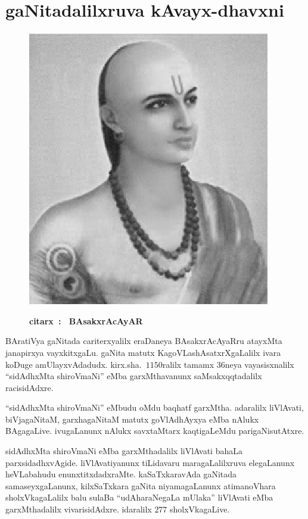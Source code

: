 \chapter{gaNitadalilxruva kAvayx-dhavxni}\label{chap13}

\begin{figure}
  \centering\includegraphics[scale=0.8]{src/figures/bhaskaracharya-II.eps}
  
  {\bf citarx~:~ BAsakxrAcAyAR}
    \end{figure}
    
BAratiVya gaNitada cariterxyalilx eraDaneya BAsakxrAcAyaRru atayxMta janapirxya vayxkitxgaLu. gaNita matutx KagoVLashAsatxrXgaLalilx ivara koDuge amUlayxvAdadudx. kirx.sha.\ $1150$ralilx tamamx $36$neya vayasisxnalilx ``sidAdhxMta shiroVmaNi'' eMba garxMthavanunx saMsakxqqtadalilx racisidAdxre.

``sidAdhxMta shiroVmaNi'' eMbudu oMdu baqhatf garxMtha. adaralilx liVlAvati, biVjagaNitaM, garxhagaNitaM matutx goVlAdhAyxya eMba nAlukx BAgagaLive. ivugaLanunx nAlukx savxtaMtarx kaqtigaLeMdu parigaNisutAtxre.

sidAdhxMta shiroVmaNi eMba garxMthadalilx liVlAvati bahaLa parxsidadhxvAgide. liVlAvatiyanunx tiLidavaru maragaLalilxruva elegaLanunx heVLabahudu enunxtitxdadxraMte. kaSaTxkaravAda gaNitada samaseyxgaLanunx, kilxSaTxkara gaNita niyamagaLanunx atimanoVhara sholxVkagaLalilx balu sulaBa ``udAharaNegaLa mUlaka'' liVlAvati eMba garxMthadalilx vivarisidAdxre. idaralilx $277$ sholxVkagaLive.

